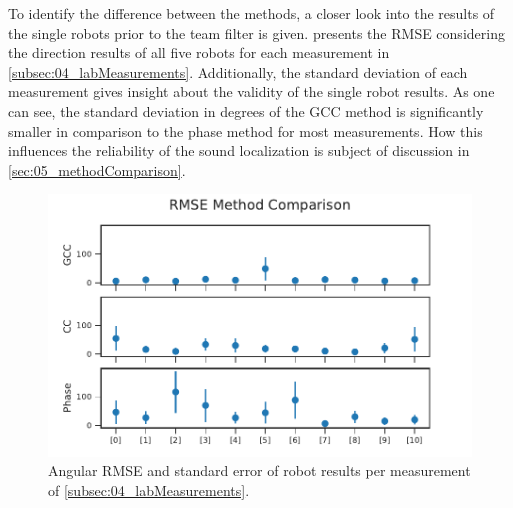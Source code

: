 To identify the difference between the methods, a closer look
into the results of the single robots prior to the team filter is given.
 presents the \ac{RMSE} considering the
direction results of all five robots for each measurement in
\cref{subsec:04_labMeasurements}.
Additionally, the standard deviation of each measurement gives insight
about the validity of the single robot results.
As one can see, the standard deviation in degrees of the \ac{GCC} method is
significantly smaller in comparison to the phase method for most
measurements.
How this influences the reliability of the sound localization is
subject of discussion in \cref{sec:05_methodComparison}.
\begin{figure}[ht]
	\centering
		\includegraphics[]{figures/evaluation/compare_rmse}
	\caption{Angular RMSE and standard error of robot results per
	measurement of \cref{subsec:04_labMeasurements}.}
    \label{fig:04_compareRmse}
\end{figure}


